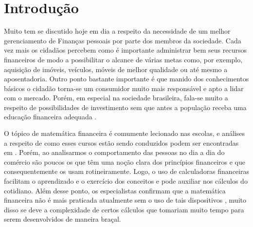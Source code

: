 \chapter{Introdução}




Muito tem se discutido hoje em dia a respeito da necessidade de um melhor gerenciamento de Finanças pessoais por parte dos membros da sociedade. Cada vez mais os cidadãos percebem como é importante administrar bem seus recursos financeiros de modo a possibilitar o alcance de várias metas como, por exemplo, aquisição de imóveis, veículos, móveis de melhor qualidade ou até mesmo a aposentadoria. Outro ponto bastante importante é que manido dos conhecimentos básicos o cidadão torna-se um consumidor muito mais responsável e apto a lidar com o mercado. Porém, em especial na sociedade brasileira, fala-se muito a respeito de possibilidades de investimento sem que antes a população receba uma educação financeira adequada \cite{valoreducacao}. 

O tópico de matemática financeira é comumente lecionado nas escolas, e análises a respeito de como esses cursos estão sendo conduzidos podem ser encontradas em \cite{educacaoMedio}. Porém, ao analisarmos o comportamento das pessoas no dia a dia do comércio são poucos os que têm uma noção clara dos princípios financeiros e que consequentemente os usam rotineiramente. Logo, o uso de calculadoras financeiras facilitam o aprendizado e o exercício dos conceitos e pode auxiliar nos cálculos do cotidiano. Além desse ponto, os especialistas confirmam que a matemática financeira não é mais praticada atualmente sem o uso de tais dispositivos \cite{matFinanceira}, muito disso se deve a complexidade de certos cálculos que tomariam muito tempo para serem desenvolvidos de maneira braçal.

